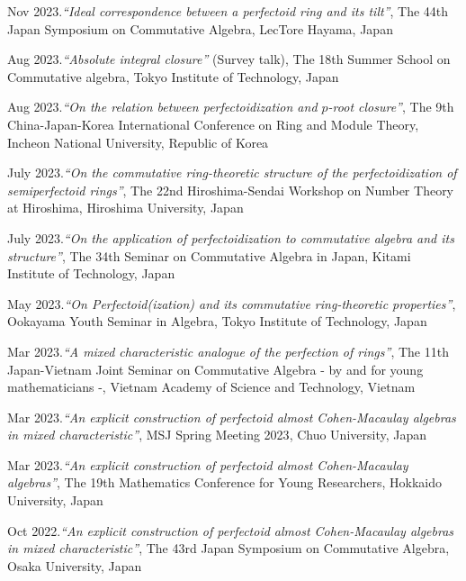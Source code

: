\documentclass[10pt,a4paper,sans]{moderncv}
\begin{document}
\begin{etaremune}[start=\totvalue{talks}]
  \item {} Nov 2023.\emph{``Ideal correspondence between a perfectoid ring and its tilt''}, \textsf{The 44th Japan Symposium on Commutative Algebra}, LecTore Hayama, Japan
  \item {} Aug 2023.\emph{``Absolute integral closure''} (Survey talk), \textsf{The 18th Summer School on Commutative algebra}, Tokyo Institute of Technology, Japan
  \item {} Aug 2023.\emph{``On the relation between perfectoidization and \(p\)-root closure''}, \textsf{The 9th China-Japan-Korea International Conference on Ring and Module Theory}, Incheon National University, Republic of Korea
  \item {} July 2023.\emph{``On the commutative ring-theoretic structure of the perfectoidization of semiperfectoid rings''}, \textsf{The 22nd Hiroshima-Sendai Workshop on Number Theory at Hiroshima}, Hiroshima University, Japan
  \item {} July 2023.\emph{``On the application of perfectoidization to commutative algebra and its structure''}, \textsf{The 34th Seminar on Commutative Algebra in Japan}, Kitami Institute of Technology, Japan
  \item {} May 2023.\emph{``On Perfectoid(ization) and its commutative ring-theoretic properties''}, \textsf{Ookayama Youth Seminar in Algebra}, Tokyo Institute of Technology, Japan
  \item {} Mar 2023.\emph{``A mixed characteristic analogue of the perfection of rings''}, \textsf{The 11th Japan-Vietnam Joint Seminar on Commutative Algebra - by and for young mathematicians -}, Vietnam Academy of Science and Technology, Vietnam
  \item {} Mar 2023.\emph{``An explicit construction of perfectoid almost Cohen-Macaulay algebras in mixed characteristic''}, \textsf{MSJ Spring Meeting 2023}, Chuo University, Japan
  \item {} Mar 2023.\emph{``An explicit construction of perfectoid almost Cohen-Macaulay algebras''}, \textsf{The 19th Mathematics Conference for Young Researchers}, Hokkaido University, Japan
  \item {} Oct 2022.\emph{``An explicit construction of perfectoid almost Cohen-Macaulay algebras in mixed characteristic''}, \textsf{The 43rd Japan Symposium on Commutative Algebra}, Osaka University, Japan
\end{etaremune}
\end{document}
